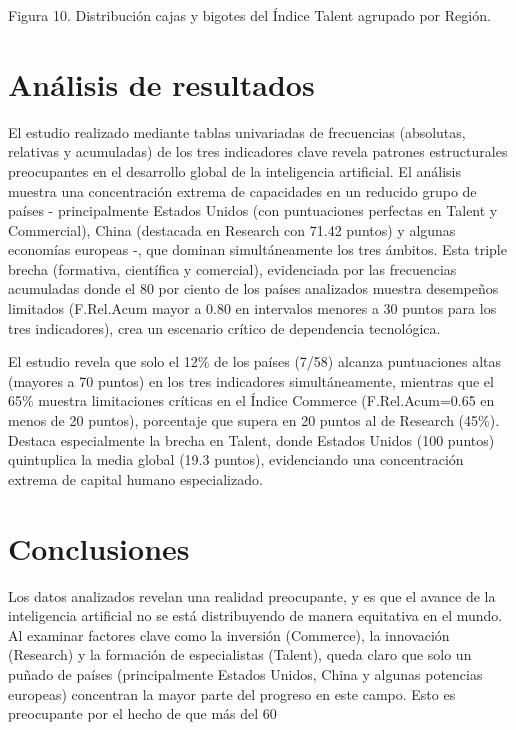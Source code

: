 \documentclass[
]{article}
\begin{document}
\begin{multicols}{2}
Figura 10. Distribución cajas y bigotes del Índice Talent agrupado por Región.

\section{Análisis de resultados}
El estudio realizado mediante tablas univariadas de frecuencias (absolutas, relativas y acumuladas) de los tres indicadores clave revela patrones estructurales preocupantes en el desarrollo global de la inteligencia artificial. El análisis muestra una concentración extrema de capacidades en un reducido grupo de países - principalmente Estados Unidos (con puntuaciones perfectas en Talent y Commercial), China (destacada en Research con 71.42 puntos) y algunas economías europeas -, que dominan simultáneamente los tres ámbitos. Esta triple brecha (formativa, científica y comercial), evidenciada por las frecuencias acumuladas donde el 80 por ciento de los países analizados muestra desempeños limitados (F.Rel.Acum mayor a 0.80 en intervalos menores a 30 puntos para los tres indicadores), crea un escenario crítico de dependencia tecnológica.

El estudio revela que solo el 12\% de los países (7/58) alcanza puntuaciones altas (mayores a 70 puntos) en los tres indicadores simultáneamente, mientras que el 65\% muestra limitaciones críticas en el Índice Commerce (F.Rel.Acum=0.65 en menos de 20 puntos), porcentaje que supera en 20 puntos al de Research (45\%). Destaca especialmente la brecha en Talent, donde Estados Unidos (100 puntos) quintuplica la media global (19.3 puntos), evidenciando una concentración extrema de capital humano especializado.

\section{Conclusiones}

Los datos analizados revelan una realidad preocupante, y es que el avance de la inteligencia artificial no se está distribuyendo de manera equitativa en el mundo. Al examinar factores clave como la inversión (Commerce), la innovación (Research) y la formación de especialistas (Talent), queda claro que solo un puñado de países (principalmente Estados Unidos, China y algunas potencias europeas) concentran la mayor parte del progreso en este campo. Esto es preocupante por el hecho de que más del 60%


\end{multicols}
\end{document}
